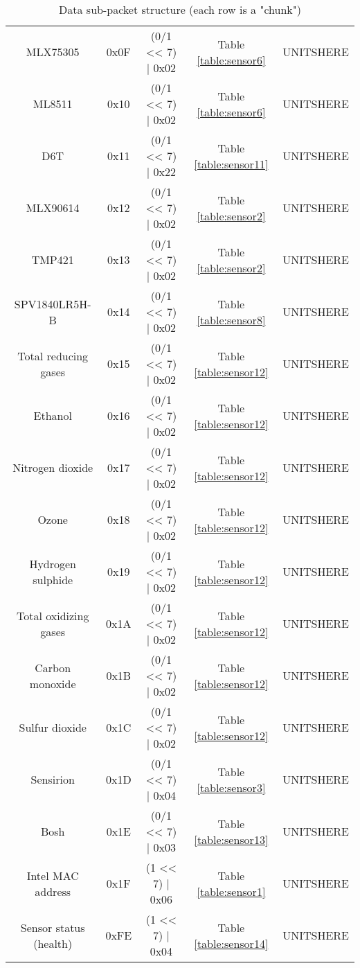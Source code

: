 \begin{table}[H]
{\begin{tabular}{|c c c c c|}
        MLX75305 & 0x0F & (0/1 << 7) | 0x02 & Table \ref{table:sensor6} & UNITSHERE \\
        ML8511 & 0x10 & (0/1 << 7) | 0x02 & Table \ref{table:sensor6} & UNITSHERE \\
        D6T & 0x11 & (0/1 << 7) | 0x22 & Table \ref{table:sensor11} & UNITSHERE \\
        MLX90614 & 0x12 & (0/1 << 7) | 0x02 & Table \ref{table:sensor2} & UNITSHERE \\
        TMP421 & 0x13 & (0/1 << 7) | 0x02 & Table \ref{table:sensor2} & UNITSHERE \\
        SPV1840LR5H-B & 0x14 & (0/1 << 7) | 0x02 & Table \ref{table:sensor8} & UNITSHERE \\
        Total reducing gases & 0x15 & (0/1 << 7) | 0x02 & Table \ref{table:sensor12} & UNITSHERE \\
        Ethanol & 0x16 & (0/1 << 7) | 0x02 & Table \ref{table:sensor12} & UNITSHERE \\
        Nitrogen dioxide & 0x17 & (0/1 << 7) | 0x02 & Table \ref{table:sensor12} & UNITSHERE \\
        Ozone & 0x18 & (0/1 << 7) | 0x02 & Table \ref{table:sensor12} & UNITSHERE \\
        Hydrogen sulphide & 0x19 & (0/1 << 7) | 0x02 & Table \ref{table:sensor12} & UNITSHERE \\
        Total oxidizing gases & 0x1A & (0/1 << 7) | 0x02 & Table \ref{table:sensor12} & UNITSHERE \\
        Carbon monoxide & 0x1B & (0/1 << 7) | 0x02 & Table \ref{table:sensor12} & UNITSHERE \\
        Sulfur dioxide & 0x1C & (0/1 << 7) | 0x02 & Table \ref{table:sensor12} & UNITSHERE \\
        Sensirion & 0x1D & (0/1 << 7) | 0x04 & Table \ref{table:sensor3} & UNITSHERE \\
        Bosh & 0x1E & (0/1 << 7) | 0x03 & Table \ref{table:sensor13} & UNITSHERE \\
        Intel MAC address & 0x1F & (1 << 7) | 0x06 & Table \ref{table:sensor1} & UNITSHERE \\
        Sensor status (health) & 0xFE & (1 << 7) | 0x04 & Table \ref{table:sensor14} & UNITSHERE \\
        \hline
    \end{tabular}
    }
    \caption{Data sub-packet structure (each row is a "chunk")}
    \label{table:dataChunk}
\end{table}